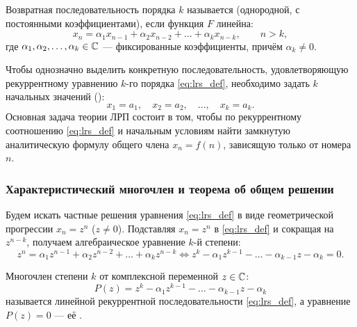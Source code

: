 \begin{definition}
    Возвратная последовательность порядка $k$ называется  (однородной, с постоянными 
    коэффициентами), если функция $F$ линейна:
    \begin{equation} \label{eq:lrs_def}
        x_n = \alpha_1 x_{n-1} + \alpha_2 x_{n-2} + \dots + \alpha_k x_{n-k}, 
        \qquad n > k, \tag{10}
    \end{equation}
    где $\alpha_1, \alpha_2, \dots, \alpha_k \in \mathbb{C}$ --- фиксированные 
    коэффициенты, причём $\alpha_k \neq 0$.
\end{definition}

\begin{remark}[Задача о поиске явной формулы $x_n = f(n)$]
    Чтобы однозначно выделить конкретную последовательность, удовлетворяющую 
    рекуррентному уравнению $k$-го порядка \eqref{eq:lrs_def}, необходимо 
    задать $k$ начальных значений ():
    \[
        x_1 = a_1, \quad x_2 = a_2, \quad \dots, \quad x_k = a_k.
    \]
    Основная задача теории ЛРП состоит в том, чтобы по рекуррентному 
    соотношению \eqref{eq:lrs_def} и начальным условиям найти замкнутую 
    аналитическую формулу общего члена $x_n = f(n)$, зависящую только от 
    номера $n$.
\end{remark}

\subsubsection{Характеристический многочлен и теорема об общем решении}

Будем искать частные решения уравнения \eqref{eq:lrs_def} в виде 
геометрической прогрессии $x_n = z^n$ ($z \neq 0$). Подставляя $x_n = z^n$ 
в \eqref{eq:lrs_def} и сокращая на $z^{n-k}$, получаем алгебраическое 
уравнение $k$-й степени:
\[
    z^n = \alpha_1 z^{n-1} + \alpha_2 z^{n-2} + \dots + \alpha_k z^{n-k} \iff 
    z^k - \alpha_1 z^{k-1} - \dots - \alpha_{k-1} z - \alpha_k = 0.
\]

\begin{definition}
    Многочлен степени $k$ от комплексной переменной $z \in \mathbb{C}$:
    \begin{equation} \label{eq:char_poly}
        P(z) = z^k - \alpha_1 z^{k-1} - \dots - \alpha_{k-1} z - \alpha_k \tag{11}
    \end{equation}
    называется  линейной 
    рекуррентной последовательности \eqref{eq:lrs_def}, а уравнение 
    $P(z) = 0$ --- её .
\end{definition}

